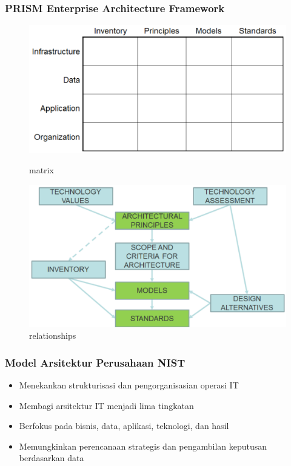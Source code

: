 \documentclass{beamer}
\begin{document}
	{
		\begin{frame}
			\frametitle{PRISM Enterprise Architecture Framework}
			\begin{center}
				
				\begin{figure}[ht]
					\begin{minipage}[b]{0.49\linewidth}
						\centering
						\includegraphics[width=\textwidth]{../figures/prism_matrix}
						\caption{matrix}
					\end{minipage}
					\hfill
					\begin{minipage}[b]{0.49\linewidth}
						\centering
						\includegraphics[width=\textwidth]{../figures/prism_relationships}
						\caption{relationships}
					\end{minipage}
				\end{figure}
				
			\end{center}
		\end{frame}
	}

	\begin{frame}
		\frametitle{Model Arsitektur Perusahaan NIST}
		\begin{itemize}
			\item Menekankan strukturisasi dan pengorganisasian operasi IT
			\item Membagi arsitektur IT menjadi lima tingkatan
			\item Berfokus pada bisnis, data, aplikasi, teknologi, dan hasil
			\item Memungkinkan perencanaan strategis dan pengambilan keputusan berdasarkan data
		\end{itemize}
	\end{frame}
\end{document}
